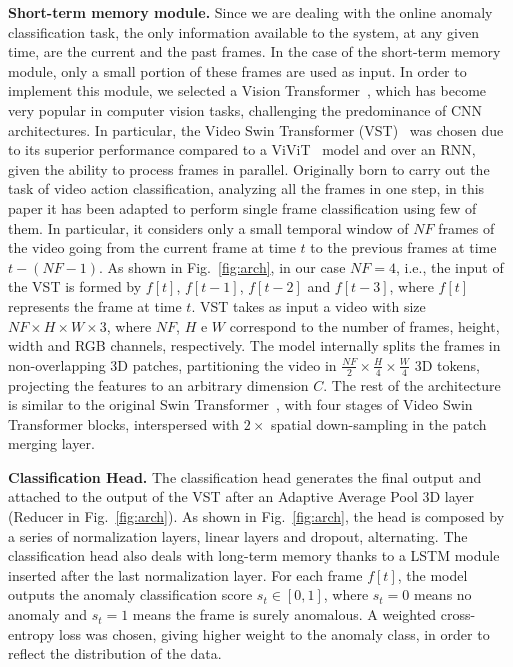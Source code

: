 \noindent\textbf{Short-term memory module.}
Since we are dealing with the online anomaly classification task, the only information available to the system, at any given time, are the current and the past frames.
In the case of the short-term memory module, only a small portion of these frames are used as input.
In order to implement this module, we selected a Vision Transformer~\cite{DBLP:conf/iclr/DosovitskiyB0WZ21}, which has become very popular in computer vision tasks, challenging the predominance of CNN architectures. 
In particular, the Video Swin Transformer (VST)~\cite{liu_video_2022} was chosen due to its superior performance compared to a ViViT~\cite{Arnab_2021_ICCV} model and over an RNN, given the ability to process frames in parallel.
Originally born to carry out the task of video action classification, analyzing all the frames in one step, in this paper it has been adapted to perform single frame classification using few of them.
In particular, it considers only a small temporal window of $NF$ 
frames of the video going from the current frame at time $t$ to the previous frames at time $t-\left(NF-1\right)$.
As shown in Fig.~\ref{fig:arch}, in our case $NF=4$, i.e., the input of the VST is formed by $f[t]$, $f[t-1]$, $f[t-2]$ and $f[t-3]$, where $f[t]$ represents the frame at time $t$.
VST takes as input a video with size $NF \times H \times W \times 3$, where $NF$, $H$ e $W$ correspond to the number of frames, height, width and RGB channels, respectively.
The model internally splits the frames in non-overlapping 3D patches, partitioning the video in $\frac{NF}{2} \times \frac{H}{4} \times \frac{W}{4}$ 3D tokens, projecting the features to an arbitrary dimension $C$.
The rest of the architecture is similar to the original Swin Transformer~\cite{liu2021Swin}, with four stages of Video Swin Transformer blocks, interspersed with $2\times$ spatial down-sampling in the patch merging layer.

\noindent\textbf{Classification Head.}
The classification head generates the final output and  attached to the output of the VST after an Adaptive Average Pool 3D layer (Reducer in Fig.~\ref{fig:arch}).
As shown in Fig.~\ref{fig:arch}, the head is composed by a series of normalization layers, linear layers and dropout, alternating. 
The classification head also deals with long-term memory thanks to a LSTM module inserted after the last normalization layer.
For each frame $f[t]$, the model outputs the anomaly classification score $s_t \in [0,1]$, where $s_t=0$ means no anomaly and $s_t=1$ means the frame is surely anomalous.
A weighted cross-entropy loss was chosen, giving higher weight to the anomaly class, in order to reflect the distribution of the data.

